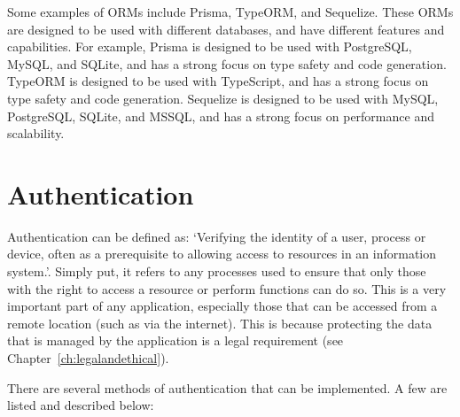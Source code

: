 \documentclass[12pt, a4paper,twoside]{report}
\theoremstyle{plain} %
\theoremstyle{definition} %
\numberwithin{equation}{chapter}
\begin{document}
Some examples of ORMs include Prisma, TypeORM, and Sequelize. These ORMs are
designed to be used with different databases, and have different features and
capabilities. For example, Prisma is designed to be used with PostgreSQL, MySQL,
and SQLite, and has a strong focus on type safety and code generation. TypeORM
is designed to be used with TypeScript, and has a strong focus on type safety
and code generation. Sequelize is designed to be used with MySQL, PostgreSQL,
SQLite, and MSSQL, and has a strong focus on performance and scalability.\cite{orms}


\section{Authentication}\label{sec:backgroundauthentication}

Authentication can be defined as: `Verifying the identity of a user, process or
device, often as a prerequisite to allowing access to resources in an information
system.'\cite{authentication}. Simply put, it refers to any processes used to
ensure that only those with the right to access a resource or perform functions
can do so. This is a very important part of any application, especially those that
can be accessed from a remote location (such as via the internet). This is because
protecting the data that is managed by the application is a legal requirement (see
Chapter~\ref{ch:legalandethical}).

There are several methods of authentication that can be implemented. A few are listed
and described below:
\end{document}
